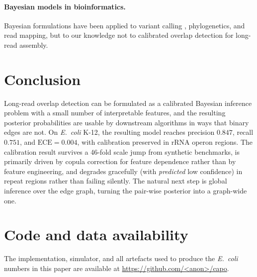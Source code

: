 \documentclass[11pt]{article}
\begin{document}
\paragraph{Bayesian models in bioinformatics.}
Bayesian formulations have been applied to variant calling
\citep{li2011statistical}, phylogenetics, and read mapping, but to our
knowledge not to calibrated overlap detection for long-read assembly.

\section{Conclusion}

Long-read overlap detection can be formulated as a calibrated Bayesian
inference problem with a small number of interpretable features, and the
resulting posterior probabilities are usable by downstream algorithms in
ways that binary edges are not. On \textit{E.\ coli} K-12, the resulting
model reaches precision $0.847$, recall $0.751$, and
$\mathrm{ECE} = 0.004$, with calibration preserved in rRNA operon regions.
The calibration result survives a 46-fold scale jump from synthetic
benchmarks, is primarily driven by copula correction for feature
dependence rather than by feature engineering, and degrades gracefully
(with \emph{predicted} low confidence) in repeat regions rather than
failing silently. The natural next step is global inference over the edge
graph, turning the pair-wise posterior into a graph-wide one.

\section*{Code and data availability}
The implementation, simulator, and all artefacts used to produce the
\textit{E.\ coli} numbers in this paper are available at
\url{https://github.com/<anon>/capo}.
\end{document}
